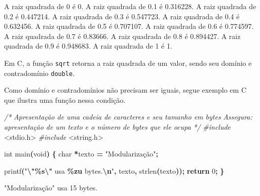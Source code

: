 \documentclass[
  11pt,
  a4paper,
]{scrbook}
\newenvironment{Shaded}{\begin{snugshade}}{\end{snugshade}}
\newcommand{\CommentTok}[1]{\textcolor[rgb]{0.56,0.35,0.01}{\textit{#1}}}
\newcommand{\ControlFlowTok}[1]{\textcolor[rgb]{0.13,0.29,0.53}{\textbf{#1}}}
\newcommand{\DataTypeTok}[1]{\textcolor[rgb]{0.13,0.29,0.53}{#1}}
\newcommand{\DecValTok}[1]{\textcolor[rgb]{0.00,0.00,0.81}{#1}}
\newcommand{\ImportTok}[1]{#1}
\newcommand{\NormalTok}[1]{#1}
\newcommand{\OperatorTok}[1]{\textcolor[rgb]{0.81,0.36,0.00}{\textbf{#1}}}
\newcommand{\PreprocessorTok}[1]{\textcolor[rgb]{0.56,0.35,0.01}{\textit{#1}}}
\newcommand{\SpecialCharTok}[1]{\textcolor[rgb]{0.81,0.36,0.00}{\textbf{#1}}}
\newcommand{\StringTok}[1]{\textcolor[rgb]{0.31,0.60,0.02}{#1}}
\begin{document}
\begin{Shaded}
\begin{Highlighting}[]
\NormalTok{A raiz quadrada de 0 é 0.}
\NormalTok{A raiz quadrada de 0.1 é 0.316228.}
\NormalTok{A raiz quadrada de 0.2 é 0.447214.}
\NormalTok{A raiz quadrada de 0.3 é 0.547723.}
\NormalTok{A raiz quadrada de 0.4 é 0.632456.}
\NormalTok{A raiz quadrada de 0.5 é 0.707107.}
\NormalTok{A raiz quadrada de 0.6 é 0.774597.}
\NormalTok{A raiz quadrada de 0.7 é 0.83666.}
\NormalTok{A raiz quadrada de 0.8 é 0.894427.}
\NormalTok{A raiz quadrada de 0.9 é 0.948683.}
\NormalTok{A raiz quadrada de 1 é 1.}
\end{Highlighting}
\end{Shaded}

Em C, a função \texttt{sqrt} retorna a raiz quadrada de um valor, sendo
seu domínio e contradomínio \texttt{double}.

Como domínio e contradomínios não precisam ser iguais, segue exemplo em
C que ilustra uma função nessa condição.

\begin{Shaded}
\begin{Highlighting}[]
\CommentTok{/*}
\CommentTok{Apresentação de uma cadeia de caracteres e seu tamanho em bytes}
\CommentTok{Assegura: apresentação de um texto e o número de bytes que ele ocupa}
\CommentTok{*/}
\PreprocessorTok{\#include }\ImportTok{\textless{}stdio.h\textgreater{}}
\PreprocessorTok{\#include }\ImportTok{\textless{}string.h\textgreater{}}

\DataTypeTok{int}\NormalTok{ main}\OperatorTok{(}\DataTypeTok{void}\OperatorTok{)} \OperatorTok{\{}
    \DataTypeTok{char} \OperatorTok{*}\NormalTok{texto }\OperatorTok{=} \StringTok{"Modularização"}\OperatorTok{;}

\NormalTok{    printf}\OperatorTok{(}\StringTok{"}\SpecialCharTok{\textbackslash{}"\%s\textbackslash{}"}\StringTok{ usa }\SpecialCharTok{\%zu}\StringTok{ bytes.}\SpecialCharTok{\textbackslash{}n}\StringTok{"}\OperatorTok{,}\NormalTok{ texto}\OperatorTok{,}\NormalTok{ strlen}\OperatorTok{(}\NormalTok{texto}\OperatorTok{));}
    \ControlFlowTok{return} \DecValTok{0}\OperatorTok{;}
\OperatorTok{\}}
\end{Highlighting}
\end{Shaded}

\begin{Shaded}
\begin{Highlighting}[]
\NormalTok{"Modularização" usa 15 bytes.}
\end{Highlighting}
\end{Shaded}
\end{document}
